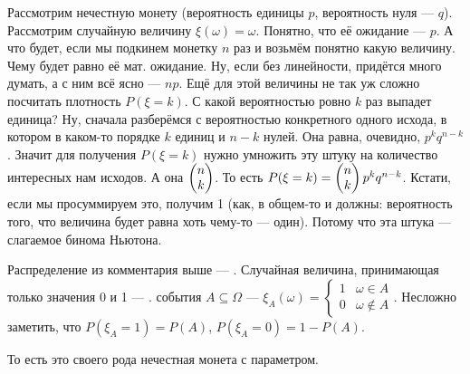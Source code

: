 \documentclass{article}
\begin{document}
\begin{itemize}
        \begin{Example}
            Рассмотрим нечестную монету (вероятность единицы $p$, вероятность нуля --- $q$). Рассмотрим случайную величину $\xi(\omega)=\omega$. Понятно, что её ожидание --- $p$. А что будет, если мы подкинем монетку $n$ раз и возьмём понятно какую величину. Чему будет равно её мат. ожидание. Ну, если без линейности, придётся много думать, а с ним всё ясно --- $np$. Ещё для этой величины не так уж сложно посчитать плотность $P(\xi=k)$. С какой вероятностью ровно $k$ раз выпадет единица? Ну, сначала разберёмся с вероятностью конкретного одного исхода, в котором в каком-то порядке $k$ единиц и $n-k$ нулей. Она равна, очевидно, $p^kq^{n-k}$. Значит для получения $P(\xi=k)$ нужно умножить эту штуку на количество интересных нам исходов. А она $\left(\begin{matrix}n\\k\end{matrix}\right)$. То есть $P(\xi=k)=\left(\begin{matrix}n\\k\end{matrix}\right)p^kq^{n-k}$. Кстати, если мы просуммируем это, получим 1 (как, в общем-то и должны: вероятность того, что величина будет равна хоть чему-то --- один). Потому что эта штука --- слагаемое бинома Ньютона.
        \end{Example}
        \dfn Распределение из комментария выше --- .
        \dfn Случайная величина, принимающая только значения 0 и 1 --- .
        \dfn {} события $A\subseteq\Omega$ --- $\xi_A(\omega)=\begin{cases}
            1 & \omega\in A\\
            0 & \omega\notin A
        \end{cases}$.
        \thm Несложно заметить, что $P(\xi_A=1)=P(A)$, $P(\xi_A=0)=1-P(A)$.
        \begin{Comment}
            То есть это своего рода нечестная монета с параметром.
        \end{Comment}
\end{itemize}
\end{document}
